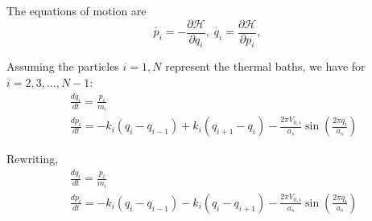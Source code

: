 The equations of motion are
\[
\dot{p_i} = -\frac{\partial\mathcal{H}}{\partial q_i}, \;
\dot{q_i} = \frac{\partial\mathcal{H}}{\partial p_i}, \;
\]

Assuming the particles $ i=1,N $ represent the thermal baths, we have for $ i=2, 3, \dots, N-1 $:
\begin{align*}
&\frac{dq_i}{dt} = \frac{p_{i}}{m_i} \\
&\frac{dp_i}{dt} = -k_{i}(q_{i}-q_{i-1}) + k_{i}(q_{i+1}-q_i) - 
\frac{2\pi V_{0,i}}{a_s}\sin \left(\frac{2\pi q_i}{a_s}\right)
\end{align*}

Rewriting, 
\begin{align*}
&\frac{dq_i}{dt} = \frac{p_{i}}{m_i} \\
&\frac{dp_i}{dt} = -k_{i}(q_{i}-q_{i-1}) - k_{i}(q_{i} - q_{i+1}) - 
\frac{2\pi V_{0,i}}{a_s}\sin \left(\frac{2\pi q_i}{a_s}\right)
\end{align*}


